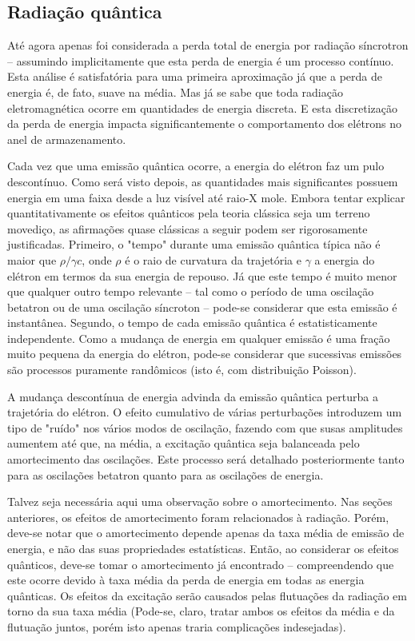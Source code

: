 \subsection{Radiação quântica}\label{sec:5.1}
Até agora apenas foi considerada a perda total de energia por radiação síncrotron -- assumindo implicitamente que esta perda de energia é um processo contínuo. Esta análise é satisfatória para uma primeira aproximação já que a perda de energia é, de fato, suave na média. Mas já se sabe que toda radiação eletromagnética ocorre em quantidades de energia discreta. E esta discretização da perda de energia impacta significantemente o comportamento dos elétrons no anel de armazenamento.

Cada vez que uma emissão quântica ocorre, a energia do elétron faz um pulo descontínuo. Como será visto depois, as quantidades mais significantes possuem energia em uma faixa desde a luz visível até raio-X mole. Embora tentar explicar quantitativamente os efeitos quânticos pela teoria clássica seja um terreno movediço, as afirmações quase clássicas a seguir podem ser rigorosamente justificadas. Primeiro, o "tempo" durante uma emissão quântica típica não é maior que $\rho/\gamma c$, onde $\rho$ é o raio de curvatura da trajetória e $\gamma$ a energia do elétron em termos da sua energia de repouso. Já que este tempo é muito menor que qualquer outro tempo relevante -- tal como o período de uma oscilação betatron ou de uma oscilação síncroton -- pode-se considerar que esta emissão é instantânea. Segundo, o tempo de cada emissão quântica é estatisticamente independente. Como a mudança de energia em qualquer emissão é uma fração muito pequena da energia do elétron, pode-se considerar que sucessivas emissões são processos puramente randômicos (isto é, com distribuição Poisson).

A mudança descontínua de energia advinda da emissão quântica perturba a trajetória do elétron. O efeito cumulativo de várias perturbações introduzem um tipo de "ruído" nos vários modos de oscilação, fazendo com que susas amplitudes aumentem até que, na média, a excitação quântica seja balanceada pelo amortecimento das oscilações. Este processo será detalhado posteriormente tanto para as oscilações betatron quanto para as oscilações de energia.

Talvez seja necessária aqui uma observação sobre o amortecimento. Nas seções anteriores, os efeitos de amortecimento foram relacionados à radiação. Porém, deve-se notar que o amortecimento depende apenas da taxa média de emissão de energia, e não das suas propriedades estatísticas. Então, ao considerar os efeitos quânticos, deve-se tomar o amortecimento já encontrado -- compreendendo que este ocorre devido à taxa média da perda de energia em todas as energia quânticas. Os efeitos da excitação serão causados pelas flutuações da radiação em torno da sua taxa média (Pode-se, claro, tratar ambos os efeitos da média e da flutuação juntos, porém isto apenas traria complicações indesejadas).

